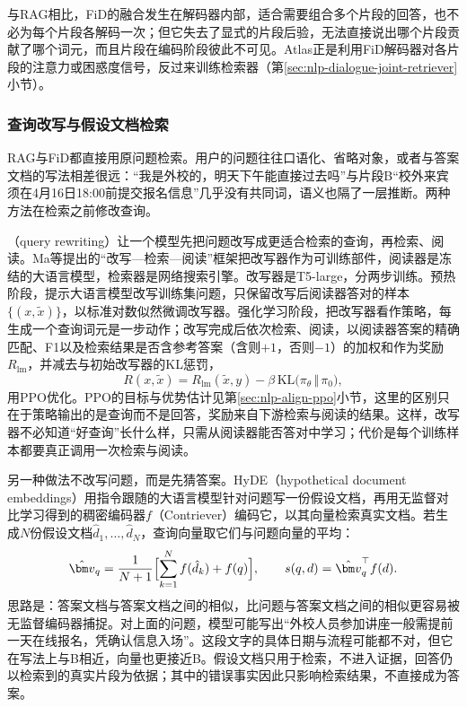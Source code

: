 与RAG相比，FiD的融合发生在解码器内部，适合需要组合多个片段的回答，也不必为每个片段各解码一次；但它失去了显式的片段后验，无法直接说出哪个片段贡献了哪个词元，而且片段在编码阶段彼此不可见。Atlas正是利用FiD解码器对各片段的注意力或困惑度信号，反过来训练检索器（第\ref{sec:nlp-dialogue-joint-retriever}小节）。

\subsubsection{查询改写与假设文档检索}
\label{sec:nlp-dialogue-query-rewrite}

RAG与FiD都直接用原问题检索。用户的问题往往口语化、省略对象，或者与答案文档的写法相差很远：“我是外校的，明天下午能直接过去吗”与片段B“校外来宾须在4月16日18:00前提交报名信息”几乎没有共同词，语义也隔了一层推断。两种方法在检索之前修改查询。

（query rewriting）让一个模型先把问题改写成更适合检索的查询，再检索、阅读。Ma等提出的“改写—检索—阅读”框架把改写器作为可训练部件，阅读器是冻结的大语言模型，检索器是网络搜索引擎。改写器是T5-large，分两步训练。预热阶段，提示大语言模型改写训练集问题，只保留改写后阅读器答对的样本$\{(x,\tilde x)\}$，以标准对数似然微调改写器。强化学习阶段，把改写器看作策略，每生成一个查询词元是一步动作；改写完成后依次检索、阅读，以阅读器答案的精确匹配、F1以及检索结果是否含参考答案（含则$+1$，否则$-1$）的加权和作为奖励$R_{\mathrm{lm}}$，并减去与初始改写器的KL惩罚，
\begin{equation}
  R(x,\tilde x)=R_{\mathrm{lm}}(\tilde x,y)-\beta\,\mathrm{KL}\bigl(\pi_\theta\,\Vert\,\pi_0\bigr),
  \label{eq:nlp-dialogue-rewrite-reward}
\end{equation}
用PPO优化。PPO的目标与优势估计见第\ref{sec:nlp-align-ppo}小节，这里的区别只在于策略输出的是查询而不是回答，奖励来自下游检索与阅读的结果。这样，改写器不必知道“好查询”长什么样，只需从阅读器能否答对中学习；代价是每个训练样本都要真正调用一次检索与阅读。

另一种做法不改写问题，而是先猜答案。HyDE（hypothetical document embeddings）用指令跟随的大语言模型针对问题写一份假设文档，再用无监督对比学习得到的稠密编码器$f$（Contriever）编码它，以其向量检索真实文档。若生成$N$份假设文档$\hat d_1,\ldots,\hat d_N$，查询向量取它们与问题向量的平均：
\begin{equation}
  \hat{\bm v}_q=\frac{1}{N+1}\Bigl[\sum_{k=1}^{N}f(\hat d_k)+f(q)\Bigr],
  \qquad s(q,d)=\hat{\bm v}_q^{\top}f(d).
  \label{eq:nlp-dialogue-hyde}
\end{equation}
思路是：答案文档与答案文档之间的相似，比问题与答案文档之间的相似更容易被无监督编码器捕捉。对上面的问题，模型可能写出“外校人员参加讲座一般需提前一天在线报名，凭确认信息入场”。这段文字的具体日期与流程可能都不对，但它在写法上与B相近，向量也更接近B。假设文档只用于检索，不进入证据，回答仍以检索到的真实片段为依据；其中的错误事实因此只影响检索结果，不直接成为答案。

